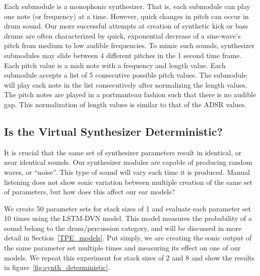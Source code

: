 \documentclass[\main/thesis.tex]{subfiles}
\begin{document}
Each submodule is a monophonic synthesizer. That is, each submodule can play one note (or frequency) at a time. However, quick changes in pitch can occur in drum sound. Our more successful attempts at creation of synthetic kick or bass drums are often characterized by quick, exponential decrease of a sine-wave's pitch from medium to low audible frequencies. To mimic such sounds, synthesizer submodules may slide between 4 different pitches in the 1 second time frame. Each pitch value is a midi note with a frequency and length value. Each submodule accepts a list of 5 consecutive possible pitch values. The submodule will play each note in the list consecutively after normalizing the length values. The pitch notes are played in a portmanteau fashion such that there is no audible gap. This normalization of length values is similar to that of the ADSR values. 


\subsection{Is the Virtual Synthesizer Deterministic?}
\label{chap3:synth_deterministic}
It is crucial that the same set of synthesizer parameters result in identical, or near identical sounds. Our synthesizer modules are capable of producing random waves, or \enquote{noise}. This type of sound will vary each time it is produced. Manual listening does not show sonic variation between multiple creation of the same set of parameters, but how does this affect our ear models?

We create 50 parameter sets for stack sizes of 1 and evaluate each parameter set 10 times using the LSTM-DVN model. This model measures the probability of a sound belong to the drum/percussion category, and will be discussed in more detail in Section~\ref{TPE_models}. Put simply, we are creating the sonic output of the same parameter set multiple times and measuring its effect on one of our models. We repeat this experiment for stack sizes of 2 and 8 and show the results in figure~\ref{fig:synth_deterministic}.
\end{document}
